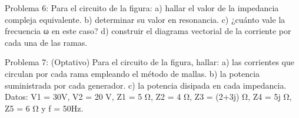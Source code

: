 Problema 6:
Para el circuito de la figura:
a)	hallar el valor de la impedancia compleja equivalente.
b)	determinar su valor en resonancia.
c)	¿cuánto vale la frecuencia ω en este caso?
d)	construir el diagrama vectorial de la corriente por cada una
de las ramas.



Problema 7: (Optativo)
Para el circuito de la figura, hallar:
a)	las	corrientes	que	circulan	por	cada	rama empleando el método de mallas.
b)	la potencia suministrada por cada generador.
c)	la potencia disipada en cada impedancia.
Datos: V1  = 30V, V2  = 20 V, Z1  = 5 Ω, Z2  = 4 Ω,  Z3  = (2+3j) Ω, Z4  = 5j Ω, Z5  = 6  Ω y f = 50Hz.


